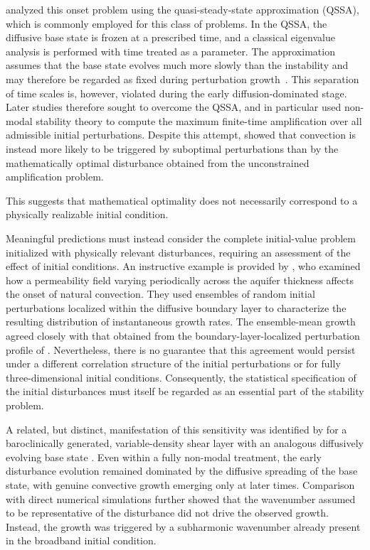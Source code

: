 \citet{riaz-et-al-2006} analyzed this onset problem using the quasi-steady-state approximation (QSSA), which is commonly employed for this class of problems. In the QSSA, the diffusive base state is frozen at a prescribed time, and a classical eigenvalue analysis is performed with time treated as a parameter. The approximation assumes that the base state evolves much more slowly than the instability and may therefore be regarded as fixed during perturbation growth~\citep{tan-homsy-1986}. This separation of time scales is, however, violated during the early diffusion-dominated stage. Later studies therefore sought to overcome the QSSA, and in particular \citet{rapaka-et-al-2008} used non-modal stability theory to compute the maximum finite-time amplification over all admissible initial perturbations. Despite this attempt, \citet{don-nils-amir-2013} showed that convection is instead more likely to be triggered by suboptimal perturbations than by the mathematically optimal disturbance obtained from the unconstrained amplification problem.

This suggests that mathematical optimality does not necessarily correspond to a physically realizable initial condition.

Meaningful predictions must instead consider the complete initial-value problem initialized with physically relevant disturbances, requiring an assessment of the effect of initial conditions. An instructive example is provided by \citet{daniel-riaz-tchelepi-2015}, who examined how a permeability field varying periodically across the aquifer thickness affects the onset of natural convection. They used ensembles of random initial perturbations localized within the diffusive boundary layer to characterize the resulting distribution of instantaneous growth rates. The ensemble-mean growth agreed closely with that obtained from the boundary-layer-localized perturbation profile of \citet{riaz-et-al-2006}. Nevertheless, there is no guarantee that this agreement would persist under a different correlation structure of the initial perturbations or for fully three-dimensional initial conditions. Consequently, the statistical specification of the initial disturbances must itself be regarded as an essential part of the stability problem.

A related, but distinct, manifestation of this sensitivity was identified by \citet{prathama-pantano-2021} for a baroclinically generated, variable-density shear layer with an analogous diffusively evolving base state \citep{gat-et-al-2017}. Even within a fully non-modal treatment, the early disturbance evolution remained dominated by the diffusive spreading of the base state, with genuine convective growth emerging only at later times. Comparison with direct numerical simulations further showed that the wavenumber assumed to be representative of the disturbance did not drive the observed growth. Instead, the growth was triggered by a subharmonic wavenumber already present in the broadband initial condition.


